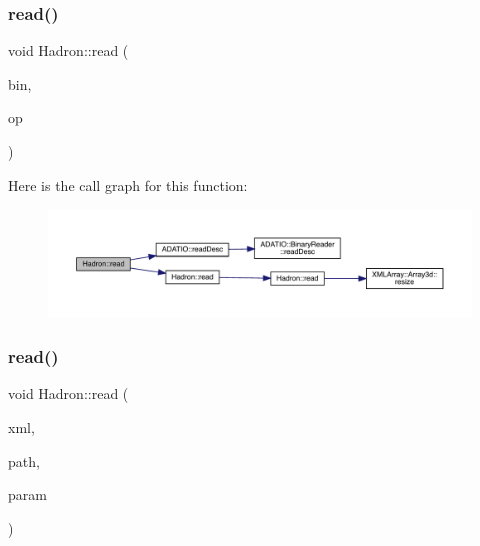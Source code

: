 \subsubsection{\texorpdfstring{read()}{read()}\hspace{0.1cm}{\footnotesize\ttfamily [70/94]}}
{\footnotesize\ttfamily void Hadron\+::read (\begin{DoxyParamCaption}\item[{\mbox{\hyperlink{classADATIO_1_1BinaryReader}{Binary\+Reader}} \&}]{bin,  }\item[{\mbox{\hyperlink{structHadron_1_1HadronVertex__t}{Hadron\+Vertex\+\_\+t}} \&}]{op }\end{DoxyParamCaption})}

Here is the call graph for this function\+:
\nopagebreak
\begin{figure}[H]
\begin{center}
\leavevmode
\includegraphics[width=350pt]{d1/daf/namespaceHadron_a2aedc52f1b4f522f0fc13bbf7426e727_cgraph}
\end{center}
\end{figure}
\mbox{\label{namespaceHadron_a6ee3d9a9ffb4f6e626fa1a73b49c9ee0}} 
\subsubsection{\texorpdfstring{read()}{read()}\hspace{0.1cm}{\footnotesize\ttfamily [71/94]}}
{\footnotesize\ttfamily void Hadron\+::read (\begin{DoxyParamCaption}\item[{\mbox{\hyperlink{classADATXML_1_1XMLReader}{X\+M\+L\+Reader}} \&}]{xml,  }\item[{const std\+::string \&}]{path,  }\item[{\mbox{\hyperlink{structHadron_1_1KeyHadronSUNNPartIrrepOp__t}{Key\+Hadron\+S\+U\+N\+N\+Part\+Irrep\+Op\+\_\+t}} \&}]{param }\end{DoxyParamCaption})}




